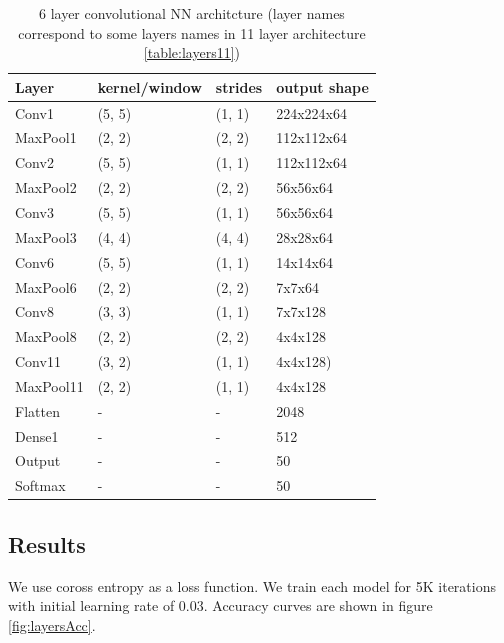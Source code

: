 \documentclass[a4paper]{article}
\begin{document}
\begin{table}[!hbt]
    \caption{ 6 layer convolutional NN architcture (layer names correspond to some layers names in 11 layer architecture \ref{table:layers11})
    \label{table:layers6}
    }
\begin{center}
    \begin{tabular}{| l | l | l | l |}
    \hline
        Layer & kernel/window& strides & output shape\\
    \hline
        Conv1  & (5, 5)&        (1, 1)&     224x224x64  \\
    \hline
        MaxPool1 & (2, 2)&      (2, 2)&     112x112x64  \\
        Conv2  & (5, 5)&        (1, 1)&     112x112x64  \\
    \hline
        MaxPool2 & (2, 2)&      (2, 2)&     56x56x64    \\
        Conv3  & (5, 5)&        (1, 1)&     56x56x64    \\
    \hline
        MaxPool3 & (4, 4)&      (4, 4)&     28x28x64    \\
        Conv6  & (5, 5)&        (1, 1)&     14x14x64  \\
    \hline
        MaxPool6 & (2, 2)&      (2, 2)&     7x7x64  \\
        Conv8  & (3, 3)&        (1, 1)&     7x7x128\\
    \hline
        MaxPool8 & (2, 2)&      (2, 2)&     4x4x128  \\
        Conv11 & (3, 2)&        (1, 1)&     4x4x128)\\  %
    \hline
        MaxPool11 & (2, 2)&      (1, 1)&     4x4x128  \\
        Flatten & - & - & 2048 \\
        Dense1 & - & - & 512 \\
    \hline
        Output & - & - & 50 \\
        Softmax & - & - & 50 \\
    \hline
    \end{tabular}
\end{center}
\end{table}

\subsection{Results}
We use coross entropy as a loss function.
We train each model for 5K iterations with initial learning rate of 0.03.
Accuracy curves are shown in figure \ref{fig:layersAcc}.
\end{document}
